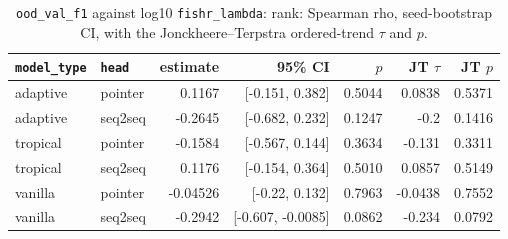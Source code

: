 \documentclass[10pt]{article}
\begin{document}
{\small
\begin{longtable}{llrrrrr}
\caption{\texttt{ood\_val\_f1} against log10 \texttt{fishr\_lambda}: rank: Spearman rho, seed-bootstrap CI, with the Jonckheere--Terpstra ordered-trend $\tau$ and $p$.}\label{tab:trend-ood_val_f1}\\
\toprule
\texttt{model\_type} & \texttt{head} & estimate & 95\% CI & $p$ & JT $\tau$ & JT $p$\\
\midrule
\endhead
adaptive & pointer & 0.1167 & [-0.151, 0.382] & 0.5044 & 0.0838 & 0.5371\\
adaptive & seq2seq & -0.2645 & [-0.682, 0.232] & 0.1247 & -0.2 & 0.1416\\
tropical & pointer & -0.1584 & [-0.567, 0.144] & 0.3634 & -0.131 & 0.3311\\
tropical & seq2seq & 0.1176 & [-0.154, 0.364] & 0.5010 & 0.0857 & 0.5149\\
vanilla & pointer & -0.04526 & [-0.22, 0.132] & 0.7963 & -0.0438 & 0.7552\\
vanilla & seq2seq & -0.2942 & [-0.607, -0.0085] & 0.0862 & -0.234 & 0.0792\\
\bottomrule
\end{longtable}
}
\end{document}
